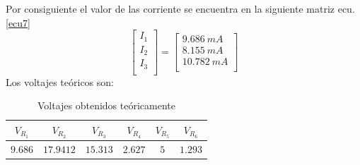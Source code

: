 \documentclass[twocolumn]{IEEEtran}
\begin{document}
\noindent
Por consiguiente el valor de las corriente se encuentra en la siguiente matriz ecu. \ref{ecu7}
\begin{equation}
\left[ \begin{array}{l}
 {I_1} \\ 
 {I_2} \\ 
 {I_3} \\ 
 \end{array} \right] = \left[ \begin{array}{l}
 9.686 \ mA\\ 
 8.155 \ mA\\ 
 10.782 \ mA\\ 
 \end{array} \right]
\label{ecu7}
\end{equation}
\noindent
Los voltajes teóricos son:

\begin{table}[H]
	\centering
\begin{tabular}[c]{|c|c|c|c|c|c|} \hline
$V_{R_1}$ & $V_{R_2}$ & $V_{R_3}$ & $V_{R_4}$ & $V_{R_5}$ & $V_{R_6}$ \\ \hline
$9.686$ & $17.9412$ & $15.313$ & $2.627$ & $5$ & $1.293$ \\ \hline
\end{tabular}
	\caption{Voltajes obtenidos teóricamente}
	\label{tab1}
\end{table}
\end{document}
